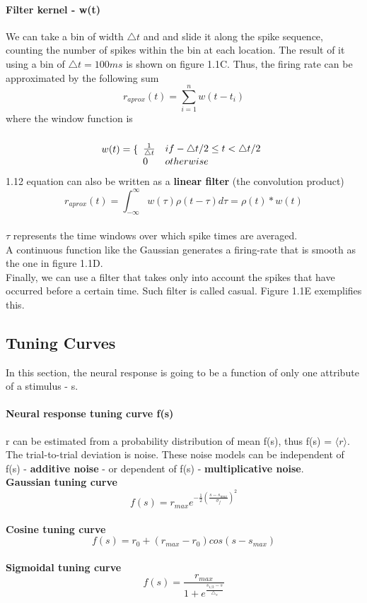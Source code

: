 \documentclass{report}
\begin{document}
\paragraph{Filter kernel - w(t)} We can take a bin of width $\triangle t$ and and slide it along the spike sequence, counting the number of spikes within the bin at each location. The result of it using a bin of $\triangle t = 100ms$ is shown on figure 1.1C. Thus, the firing rate can be approximated by the following sum
\begin{equation}
r_{aprox}(t) = \sum_{i=1}^{n} w(t-t_{i})
\end{equation}
where the window function is
\begin{equation}
w(t) = \{
\begin{array}{ll}
\\\frac{1}{\triangle t} & if -\triangle t/2 \leq t < \triangle t/2
\\0  & otherwise
\end{array}
\\
\end{equation}
1.12 equation can also be written as a \textbf{linear filter} (the convolution product) 
\begin{equation}
r_{aprox}(t) = \int_{-\infty}^{\infty}w(\tau)\rho(t-\tau) d\tau = \rho(t)*w(t)
\end{equation}
\\ $\tau$ represents the time windows over which spike times are averaged.
\\A continuous function like the Gaussian generates a firing-rate that is smooth as the one in figure 1.1D.
\\ Finally, we can use a filter that takes only into account the spikes that have occurred before a certain time. Such filter is called casual. Figure 1.1E exemplifies this. 
\subsection{Tuning Curves}
In this section, the neural response is going to be a function of only one attribute of a stimulus - s.
\paragraph{Neural response tuning curve f(s)} r can be estimated from a probability distribution of mean f(s), thus f(s) = $\langle r \rangle$. The trial-to-trial deviation is noise. These noise models can be independent of f(s) - \textbf{additive noise} - or dependent of f(s) - \textbf{multiplicative noise}.
\\\textbf{Gaussian tuning curve}
\begin{equation}
f(s) = r_{max}e^{-\frac{1}{2}(\frac{s-s_{max}}{\sigma_{f}})^{2}}
\end{equation}
\\\textbf{Cosine tuning curve}
\begin{equation}
f(s) = r_{0} + (r_{max}-r_{0})cos(s-s_{max})
\end{equation}
\\\textbf{Sigmoidal tuning curve}
\begin{equation}
f(s) = \frac{r_{max}}{1+e^{\frac{s_{1/2}-s}{\triangle_{s}}}}
\end{equation}
\end{document}
